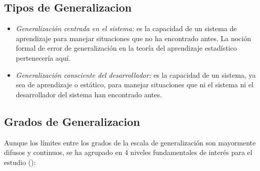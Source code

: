 \subsection{Tipos de Generalizacion}

\begin{itemize}
\item \textit{Generalización centrada en el sistema:} es la capacidad de un sistema de aprendizaje para manejar situaciones que no ha encontrado antes. La noción formal de error de generalización en la teoría del aprendizaje estadístico pertenecería aquí.

\item \textit{Generalización consciente del desarrollador:} es la capacidad de un sistema, ya sea de aprendizaje o estático, para manejar situaciones que ni el sistema ni el desarrollador del sistema han encontrado antes.
\end{itemize}

\subsection{Grados de Generalizacion}

Aunque los límites entre los grados de la escala de generalización son mayormente difusos y continuos, se ha agrupado en 4 niveles fundamentales de interés para el estudio (\cite{chollet2019measure}):

